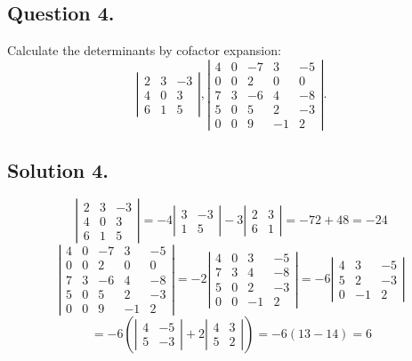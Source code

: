 \documentclass{article}
\begin{document}
\subsection*{Question 4.}
Calculate the determinants by cofactor expansion:
\[\left\vert \begin{array}{rrr}
2 & 3 & -3 \\ 4 & 0 & 3 \\ 6 & 1 & 5
\end{array}\right\vert, \left\vert\begin{array}{rrrrr}
4 & 0 & -7 & 3 & -5 \\0 &0&2&0&0\\7&3&-6&4&-8\\5&0&5&2&-3\\0&0&9&-1&2 
\end{array}\right\vert.\]
\subsection*{Solution 4.}
\[\left\vert \begin{array}{rrr}
2 & 3 & -3 \\ 4 & 0 & 3 \\ 6 & 1 & 5
\end{array}\right\vert=-4\left\vert \begin{array}{rr}
3 & -3  \\ 1 & 5\end{array}\right\vert -3\left \vert \begin{array}{rr}
2 & 3  \\ 6 & 1\end{array}\right\vert=-72+48=-24\]
\[\left\vert\begin{array}{rrrrr}
4 & 0 & -7 & 3 & -5 \\0 &0&2&0&0\\7&3&-6&4&-8\\5&0&5&2&-3\\0&0&9&-1&2 
\end{array}\right\vert=-2\left\vert\begin{array}{rrrr}
4 & 0 & 3 & -5 \\7&3&4&-8\\5&0&2&-3\\0&0&-1&2 
\end{array}\right\vert=-6\left\vert\begin{array}{rrr}
4 &  3 & -5 \\5&2&-3\\0&-1&2 
\end{array}\right\vert\]
\[=-6\left(\left\vert\begin{array}{rr}
4 & -5 \\5&-3\end{array}\right\vert+2\left\vert\begin{array}{rr}
4 &  3  \\5&2\end{array}\right\vert\right)=-6(13-14)=6\]
\end{document}
